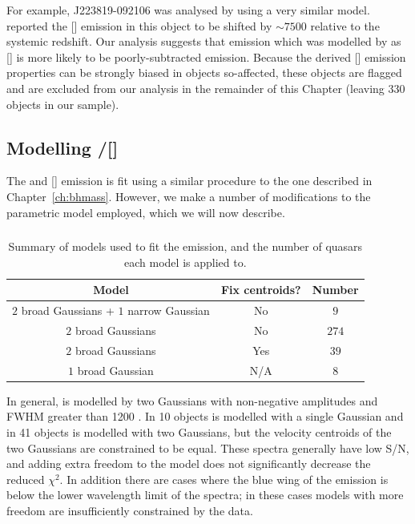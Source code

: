 For example, J223819-092106 was analysed by \citet{shen16a} using a very similar model. 
\citet{shen16a} reported the [] emission in this object to be shifted by $\sim7500$ \kms relative to the \citet{hewett10} systemic redshift. 
Our analysis suggests that emission which was modelled by \citet{shen16a} as [] is more likely to be poorly-subtracted  emission.  
Because the derived [] emission properties can be strongly biased in objects so-affected, these objects are flagged and are excluded from our analysis in the remainder of this Chapter (leaving 330 objects in our sample). 

\subsection{Modelling \hbns/[]}
\label{sec:oiiimodel}

The \hb and [] emission is fit using a similar procedure to the one described in Chapter~\ref{ch:bhmass}. 
However, we make a number of modifications to the parametric model employed, which we will now describe. 

\subsubsection{\hb}

\begin{table}
  \centering
  \footnotesize 
  \caption{Summary of models used to fit the \hb emission, and the number of quasars each model is applied to.}
  \label{tab:hbmod}
    \begin{tabular}{ccc} 
    \hline
    Model & Fix centroids? & Number \\
    \hline
    $2$ broad Gaussians + $1$ narrow Gaussian & No & $9$ \\
    $2$ broad Gaussians & No  &  $274$ \\
    $2$ broad Gaussians & Yes &  $39$ \\
    $1$ broad Gaussian  & N/A &  $8$ \\
    \hline
    \end{tabular}
\end{table} 

In general, \hb is modelled by two Gaussians with non-negative amplitudes and FWHM greater than 1200 \kms.
In 10 objects \hb is modelled with a single Gaussian and in 41 objects \hb is modelled with two Gaussians, but the velocity centroids of the two Gaussians are constrained to be equal. 
These spectra generally have low S/N, and adding extra freedom to the model does not significantly decrease the  reduced $\chi^2$.
In addition there are cases where the blue wing of the \hb emission is below the lower wavelength limit of the spectra; in these cases models with more freedom are insufficiently constrained by the data.    

